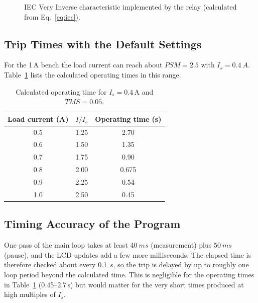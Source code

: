 \documentclass[12pt, a4paper]{article}
\begin{document}
\begin{figure}[H]
  \centering
  \caption{IEC Very Inverse characteristic implemented by the relay (calculated from Eq.~\eqref{eq:iec}).}
  \label{fig:curve}
\end{figure}

\newpage

\subsection{Trip Times with the Default Settings}
For the 1\,A bench the load current can reach about $PSM = 2.5$ with $I_s = \SI{0.4}{A}$. Table~\ref{tab:times} lists the calculated operating times in this range.

\begin{table}[H]
  \centering
  \caption{Calculated operating time for $I_s = 0.4$\,A and $TMS = 0.05$.}
  \label{tab:times}
  \begin{tabular}{ccc}
    \toprule
    Load current (A) & $I/I_s$ & Operating time (s) \\
    \midrule
    0.5 & 1.25 & 2.70 \\
    0.6 & 1.50 & 1.35 \\
    0.7 & 1.75 & 0.90 \\
    0.8 & 2.00 & 0.675 \\
    0.9 & 2.25 & 0.54 \\
    1.0 & 2.50 & 0.45 \\
    \bottomrule
  \end{tabular}
\end{table}

\subsection{Timing Accuracy of the Program}
One pass of the main loop takes at least $\SI{40}{ms}$ (measurement) plus $\SI{50}{ms}$ (pause), and the LCD updates add a few more milliseconds. The elapsed time is therefore checked about every \SI{0.1}{s}, so the trip is delayed by up to roughly one loop period beyond the calculated time. This is negligible for the operating times in Table~\ref{tab:times} (0.45--2.7\,s) but would matter for the very short times produced at high multiples of $I_s$.
\end{document}
